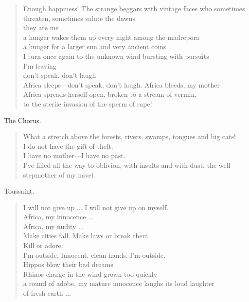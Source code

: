 \documentclass[letterpaper,article,12pt,oneside,notitlepage]{memoir}
\begin{document}
\begin{verse}
Enough happiness! The strange beggars with vintage faces who sometimes threaten, sometimes salute the dawns \\
they are me \\
a hunger wakes them up every night among the madrepora \\
a hunger for a larger sun and very ancient coins \\
I turn once again to the unknown wind bursting with pursuits \\
I'm leaving \\
don't speak, don't laugh \\
Africa sleeps---don't speak, don't laugh. Africa bleeds, my mother \\
Africa spreads herself open, broken to a stream of vermin, \\
to the sterile invasion of the sperm of rape! \\
\end{verse}

\begin{center}The Chorus.\end{center}

\begin{verse}
What a stretch above the forests, rivers, swamps, tongues and big cats! \\
I do not have the gift of theft. \\
I have no mother---I have no past. \\
I've filled all the way to oblivion, with insults and with dust, the well \\
stepmother of my navel. \\
\end{verse}

\begin{center}Toussaint.\end{center}

\begin{verse}
\hspace{1cm} I will not give up ... I will not give up on myself. \\
Africa, my innocence ... \\
Africa, my nudity ... \\
Make cities fall. Make laws or break them. \\
Kill or adore. \\
I'm outside. Innocent, clean hands. I'm outside. \\
Hippos blow their bad dreams \\
Rhinos charge in the wind grown too quickly \\
a round of adobe, my mature innocence laughs its loud laughter \\
of fresh earth ... \\
\end{verse}
\end{document}
